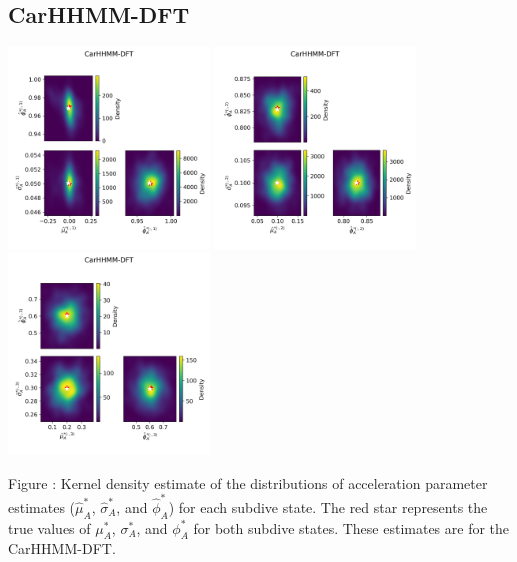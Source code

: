 \documentclass{article}
\begin{document}
        \subsection{CarHHMM-DFT}
        \begin{center}
        \includegraphics[width=2.1in]{../Plots/hhmm_FV_MLE_density_A_0_0.png}
        \includegraphics[width=2.1in]{../Plots/hhmm_FV_MLE_density_A_0_1.png}
        \includegraphics[width=2.1in]{../Plots/hhmm_FV_MLE_density_A_0_2.png}
        \end{center}
        
        \noindent Figure : Kernel density estimate of the distributions of acceleration parameter estimates ($\hat \mu^*_A$, $\hat \sigma^*_A$, and $\hat \phi^*_A$) for each subdive state. The red star represents the true values of $\mu^*_A$, $\sigma^*_A$, and $\phi^*_A$ for both subdive states. These estimates are for the CarHHMM-DFT.
        \addtocounter{fignum}{1}
        
\end{document}

